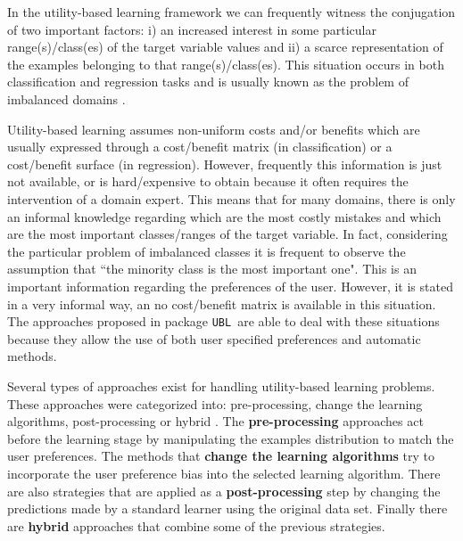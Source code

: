 \documentclass[10pt,a4paper]{article}\usepackage[]{graphicx}\usepackage[]{color}
\newcommand{\UBL}{\texttt{UBL}\ }
\newcommand{\pUBL}{package \texttt{UBL}\ }
\begin{document}
In the utility-based learning framework we can frequently witness the conjugation of two important factors: i) an increased interest in some particular range(s)/class(es) of the target variable values and ii) a scarce representation of the examples belonging to that range(s)/class(es). This situation occurs in both classification and regression tasks and is usually known as the problem of imbalanced domains \cite{branco2015survey}.

Utility-based learning assumes non-uniform costs and/or benefits which are usually expressed through a cost/benefit matrix (in classification) or a cost/benefit surface (in regression). However, frequently this information is just not available, or is hard/expensive to obtain because it often requires the intervention of a domain expert. This means that for many domains, there is only an informal knowledge regarding which are the most costly mistakes and which are the most important classes/ranges of the target variable. In fact, considering the particular problem of imbalanced classes it is frequent to observe the assumption that ``the minority class is the most important one". This is an important information regarding the preferences of the user. However, it is stated in a very informal way, an no cost/benefit matrix is available in this situation. The approaches proposed in \pUBL are able to deal with these situations because they allow the use of both user specified preferences and automatic methods.




Several types of approaches exist for handling utility-based learning problems. These approaches were categorized into: pre-processing, change the learning algorithms, post-processing or hybrid \cite{branco2015survey}. The \textbf{pre-processing} approaches act before the learning stage by manipulating the examples distribution to match the user preferences. The methods that \textbf{change the learning algorithms} try to incorporate the user preference bias into the selected learning algorithm. There are also strategies that are applied as a \textbf{post-processing} step by changing the predictions made by a standard learner using the original data set. Finally there are \textbf{hybrid} approaches that combine some of the previous strategies.
\end{document}
